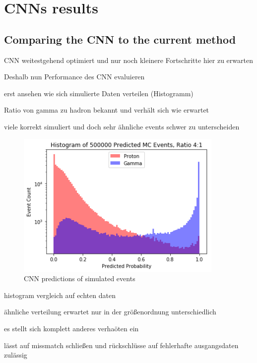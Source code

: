 \chapter{CNNs results}

\section{Comparing the CNN to the current method}

CNN weitestgehend optimiert und nur noch kleinere Fortschritte hier zu erwarten

Deshalb nun Performance des CNN evaluieren

erst ansehen wie sich simulierte Daten verteilen (Histogramm)

Ratio von gamma zu hadron bekannt und verhält sich wie erwartet

viele korrekt simuliert und doch sehr ähnliche events schwer zu unterscheiden

\begin{figure}
    \centering
    \includegraphics[width=10cm]{Plots/MC_Prediction_Histogram.png}
    \caption{CNN predictions of simulated events}
    \label{fig:histogram_simulated_data}
\end{figure}

histogram vergleich auf echten daten

ähnliche verteilung erwartet nur in der größenordnung unterschiedlich

es stellt sich komplett anderes verhaöten ein

lässt auf missmatch schließen und rückschlüsse auf fehlerhafte ausgangsdaten zulässig

